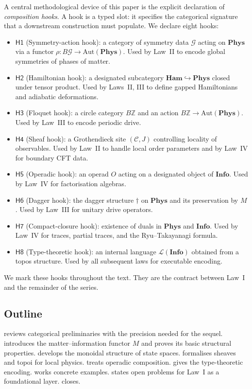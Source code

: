 \documentclass[12pt]{article}
\theoremstyle{definition}
\theoremstyle{remark}
\newcommand{\C}{\mathcal{C}}
\newcommand{\Phys}{\mathbf{Phys}}
\newcommand{\Info}{\mathbf{Info}}
\begin{document}
A central methodological device of this paper is the explicit declaration of \emph{composition hooks}. A hook is a typed slot: it specifies the categorical signature that a downstream construction must populate. We declare eight hooks:
\begin{itemize}
\item $\mathsf{H1}$ (Symmetry-action hook): a category of symmetry data $\mathcal{G}$ acting on $\Phys$ via a functor $\rho: B\mathcal{G} \to \mathrm{Aut}(\Phys)$. Used by Law~II to encode global symmetries of phases of matter.
\item $\mathsf{H2}$ (Hamiltonian hook): a designated subcategory $\mathbf{Ham} \hookrightarrow \Phys$ closed under tensor product. Used by Laws~II, III to define gapped Hamiltonians and adiabatic deformations.
\item $\mathsf{H3}$ (Floquet hook): a circle category $B\mathbb{Z}$ and an action $B\mathbb{Z} \to \mathrm{Aut}(\Phys)$. Used by Law~III to encode periodic drive.
\item $\mathsf{H4}$ (Sheaf hook): a Grothendieck site $(\C, J)$ controlling locality of observables. Used by Law~II to handle local order parameters and by Law~IV for boundary CFT data.
\item $\mathsf{H5}$ (Operadic hook): an operad $O$ acting on a designated object of $\Info$. Used by Law~IV for factorisation algebras.
\item $\mathsf{H6}$ (Dagger hook): the dagger structure $\dagger$ on $\Phys$ and its preservation by $M$. Used by Law~III for unitary drive operators.
\item $\mathsf{H7}$ (Compact-closure hook): existence of duals in $\Phys$ and $\Info$. Used by Law~IV for traces, partial traces, and the Ryu--Takayanagi formula.
\item $\mathsf{H8}$ (Type-theoretic hook): an internal language $\mathcal{L}(\Info)$ obtained from a topos structure. Used by all subsequent laws for executable encoding.
\end{itemize}

We mark these hooks throughout the text. They are the contract between Law~I and the remainder of the series.

\subsection{Outline}

 reviews categorical preliminaries with the precision needed for the sequel.  introduces the matter--information functor $M$ and proves its basic structural properties.  develops the monoidal structure of state spaces.  formalises sheaves and topoi for local physics.  treats operadic composition.  gives the type-theoretic encoding.  works concrete examples.  states open problems for Law~I as a foundational layer.  closes.
\end{document}
